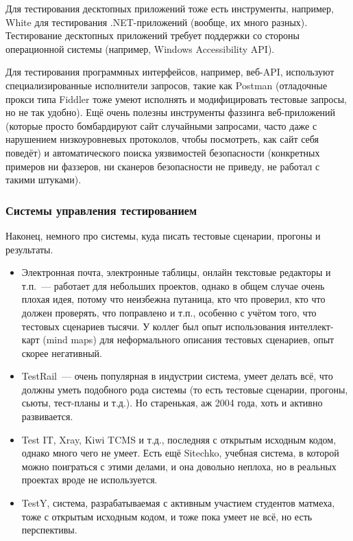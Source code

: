 \documentclass{../../text-style}
\begin{document}
Для тестирования десктопных приложений тоже есть инструменты, например, White для тестирования .NET-приложений (вообще, их много разных). Тестирование десктопных приложений требует поддержки со стороны операционной системы (например, Windows Accessibility API).

Для тестирования программных интерфейсов, например, веб-API, используют специализированные исполнители запросов, такие как Postman (отладочные прокси типа Fiddler тоже умеют исполнять и модифицировать тестовые запросы, но не так удобно). Ещё очень полезны инструменты фаззинга веб-приложений (которые просто бомбардируют сайт случайными запросами, часто даже с нарушением низкоуровневых протоколов, чтобы посмотреть, как сайт себя поведёт) и автоматического поиска уязвимостей безопасности (конкретных примеров ни фаззеров, ни сканеров безопасности не приведу, не работал с такими штуками).

\subsubsection{Системы управления тестированием}

Наконец, немного про системы, куда писать тестовые сценарии, прогоны и результаты.

\begin{itemize}
    \item Электронная почта, электронные таблицы, онлайн текстовые редакторы и т.п.~--- работает для небольших проектов, однако в общем случае очень плохая идея, потому что неизбежна путаница, кто что проверил, кто что должен проверять, что поправлено и т.п., особенно с учётом того, что тестовых сценариев тысячи. У коллег был опыт использования интеллект-карт (mind maps) для неформального описания тестовых сценариев, опыт скорее негативный.
    \item TestRail~--- очень популярная в индустрии система, умеет делать всё, что должны уметь подобного рода системы (то есть тестовые сценарии, прогоны, сьюты, тест-планы и т.д.). Но старенькая, аж 2004 года, хоть и активно развивается.
    \item Test IT, Xray, Kiwi TCMS и т.д., последняя с открытым исходным кодом, однако много чего не умеет. Есть ещё Sitechko, учебная система, в которой можно поиграться с этими делами, и она довольно неплоха, но в реальных проектах вроде не используется.
    \item TestY, система, разрабатываемая с активным участием студентов матмеха, тоже с открытым исходным кодом, и тоже пока умеет не всё, но есть перспективы.
\end{itemize}
\end{document}
